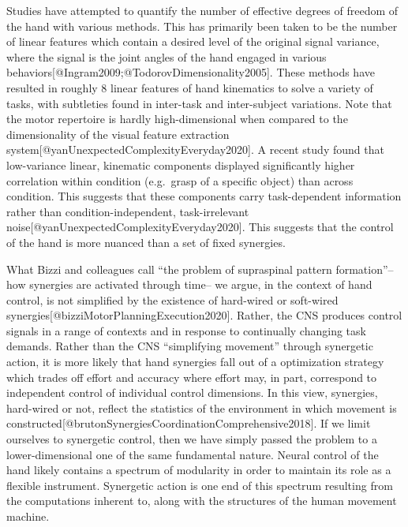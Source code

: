\documentclass[../main.tex]{subfiles}
\begin{document}
Studies have attempted to quantify the number of effective degrees of freedom of the hand with various methods. This has primarily been taken to be the number of linear features which contain a desired level of the original signal variance, where the signal is the joint angles of the hand engaged in various behaviors{[}@Ingram2009;@TodorovDimensionality2005{]}. These methods have resulted in roughly 8 linear features of hand kinematics to solve a variety of tasks, with subtleties found in inter-task and inter-subject variations. Note that the motor repertoire is hardly high-dimensional when compared to the dimensionality of the visual feature extraction system{[}@yanUnexpectedComplexityEveryday2020{]}. A recent study found that low-variance linear, kinematic components displayed significantly higher correlation within condition (e.g.~grasp of a specific object) than across condition. This suggests that these components carry task-dependent information rather than condition-independent, task-irrelevant noise{[}@yanUnexpectedComplexityEveryday2020{]}. This suggests that the control of the hand is more nuanced than a set of fixed synergies.

What Bizzi and colleagues call ``the problem of supraspinal pattern formation''--how synergies are activated through time-- we argue, in the context of hand control, is not simplified by the existence of hard-wired or soft-wired synergies{[}@bizziMotorPlanningExecution2020{]}. Rather, the CNS produces control signals in a range of contexts and in response to continually changing task demands. Rather than the CNS ``simplifying movement'' through synergetic action, it is more likely that hand synergies fall out of a optimization strategy which trades off effort and accuracy where effort may, in part, correspond to independent control of individual control dimensions. In this view, synergies, hard-wired or not, reflect the statistics of the environment in which movement is constructed{[}@brutonSynergiesCoordinationComprehensive2018{]}. If we limit ourselves to synergetic control, then we have simply passed the problem to a lower-dimensional one of the same fundamental nature. Neural control of the hand likely contains a spectrum of modularity in order to maintain its role as a flexible instrument. Synergetic action is one end of this spectrum resulting from the computations inherent to, along with the structures of the human movement machine.

\end{document}
